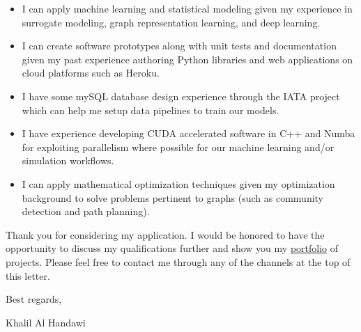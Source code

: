 \documentclass[12pt]{article} %
\begin{document}
\begin{itemize}
	\item I can apply machine learning and statistical modeling given my experience in surrogate modeling, graph representation learning, and deep learning.
	\item I can create software prototypes along with unit tests and documentation given my past experience authoring Python libraries and web applications on cloud platforms such as Heroku.
	\item I have some mySQL database design experience through the IATA project which can help me setup data pipelines to train our models.
	\item I have experience developing CUDA accelerated software in C++ and Numba for exploiting parallelism where possible for our machine learning and/or simulation workflows.
	\item I can apply mathematical optimization techniques given my optimization background to solve problems pertinent to graphs (such as community detection and path planning).
\end{itemize}

\medskip %

Thank you for considering my application. I would be honored to have the opportunity to discuss my qualifications further and show you my \href{https://khbalhandawi.github.io/projects/}{portfolio} of projects. Please feel free to contact me through any of the channels at the top of this letter.

\medskip %

Best regards,

\medskip %


Khalil Al Handawi


\medskip %

\end{document}

